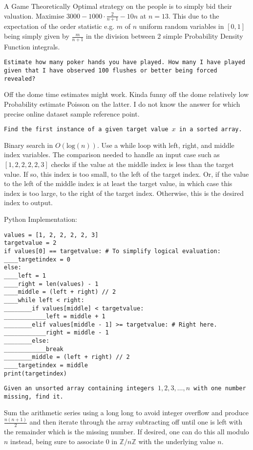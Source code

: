 A Game Theoretically Optimal strategy on the people is to simply bid their valuation. Maximise $3000 - 1000 \cdot \frac{2}{n + 1} - 10 n$ at $n = \boxed{13}$. This due to the expectation of the order statistic e.g. $m$ of $n$ uniform random variables in $[0, 1]$ being simply given by $\frac{m}{n + 1}$ in the division between $2$ simple Probability Density Function integrals.

\texttt{Estimate how many poker hands you have played. How many I have played given that I have observed 100 flushes or better being forced revealed?}

Off the dome time estimates might work. Kinda funny off the dome relatively low Probability estimate Poisson on the latter. I do not know the answer for which precise online dataset sample reference point.

\texttt{Find the first instance of a given target value $x$ in a sorted array.}

Binary search in $O(\text{log}(n))$. Use a while loop with left, right, and middle index variables. The comparison needed to handle an input case such as $[1,2,2,2,2,3]$ checks if the value at the middle index is less than the target value. If so, this index is too small, to the left of the target index. Or, if the value to the left of the middle index is at least the target value, in which case this index is too large, to the right of the target index. Otherwise, this is the desired index to output.

Python Implementation:

\begin{verbatim}
values = [1, 2, 2, 2, 2, 3]
targetvalue = 2
if values[0] == targetvalue: # To simplify logical evaluation:
____targetindex = 0
else:
____left = 1
____right = len(values) - 1
____middle = (left + right) // 2
____while left < right:
________if values[middle] < targetvalue:
____________left = middle + 1
________elif values[middle - 1] >= targetvalue: # Right here.
____________right = middle - 1
________else:
____________break
________middle = (left + right) // 2
____targetindex = middle
print(targetindex)
\end{verbatim}

\texttt{Given an unsorted array containing integers $1,2,3,\dots,n$ with one number missing, find it.}

Sum the arithmetic series using a long long to avoid integer overflow and produce $\frac{n(n+1)}{2}$ and then iterate through the array subtracting off until one is left with the remainder which is the missing number. If desired, one can do this all modulo $n$ instead, being sure to associate $0$ in $\mathbb{Z}/n\mathbb{Z}$ with the underlying value $n$.


